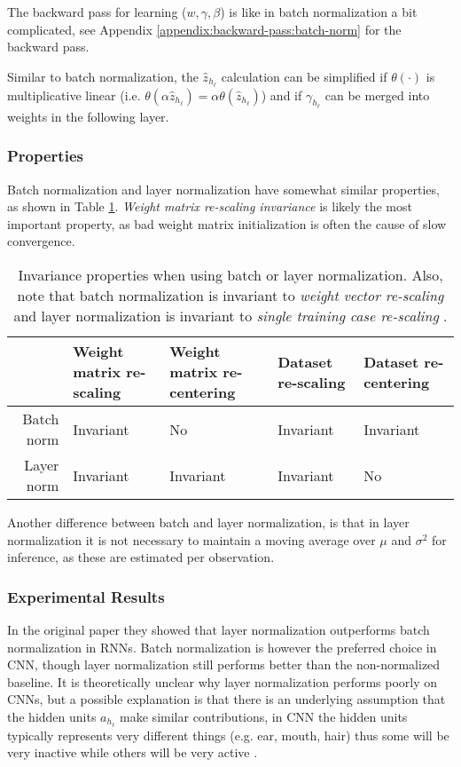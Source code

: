 The backward pass for learning ($w, \gamma, \beta$) is like in batch normalization a bit complicated, see Appendix \ref{appendix:backward-pass:batch-norm} for the backward pass.

Similar to batch normalization, the $\hat{z}_{h_\ell}$ calculation can be simplified if $\theta(\cdot)$ is multiplicative linear (i.e. $\theta(\alpha \hat{z}_{h_\ell}) = \alpha \theta(\hat{z}_{h_\ell})$) and if $\gamma_{h_\ell}$ can be merged into weights in the following layer.

\subsubsection{Properties}

Batch normalization and layer normalization have somewhat similar properties, as shown in Table \ref{table:convergence:layer-norm:properties}. \textit{Weight matrix re-scaling invariance} is likely the most important property, as bad weight matrix initialization is often the cause of slow convergence. 

\begin{table}[H]
\centering
\begin{tabular}{r|p{2cm} p{2cm} p{2cm} p{2cm}}
	           & Weight matrix re-scaling & Weight matrix re-centering & Dataset re-scaling& Dataset re-centering \\ \hline
	Batch norm & Invariant & No & Invariant & Invariant \\
	Layer norm & Invariant & Invariant & Invariant & No \\
\end{tabular}
\caption{Invariance properties when using batch or layer normalization. Also, note that batch normalization is invariant to \textit{weight vector re-scaling} and layer normalization is invariant to \textit{single training case re-scaling} \cite{layer-normalization}.}
\label{table:convergence:layer-norm:properties}
\end{table}

Another difference between batch and layer normalization, is that in layer normalization it is not necessary to maintain a moving average over $\mu$ and $\sigma^2$ for inference, as these are estimated per observation.

\subsubsection{Experimental Results}

In the original paper \cite{layer-normalization} they showed that layer normalization outperforms batch normalization in RNNs. Batch normalization is however the preferred choice in CNN, though layer normalization still performs better than the non-normalized baseline. It is theoretically unclear why layer normalization performs poorly on CNNs, but a possible explanation is that there is an underlying assumption that the hidden units $a_{h_\ell}$ make similar contributions, in CNN the hidden units typically represents very different things (e.g. ear, mouth, hair) thus some will be very inactive while others will be very active \cite{layer-normalization}.

